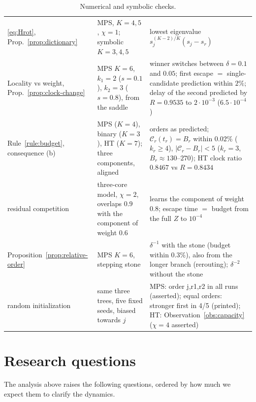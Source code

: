 \documentclass[11pt]{article}
\newcommand{\Clk}{\mathcal{C}}
\theoremstyle{definition}
\numberwithin{equation}{section}
\begin{document}
\begin{table}[tbp]
\begin{tabular}{L{0.21\textwidth}L{0.33\textwidth}L{0.38\textwidth}}
\eqref{eq:Hrot}, Prop.~\ref{prop:dictionary} & MPS, $K=4,5$, $\chi=1$; symbolic $K=3,4,5$ & lowest eigenvalue $s_j^{(K-2)/K}(s_j-s_r)$ \\
Locality vs weight, Prop.~\ref{prop:clock-change} & MPS $K=6$, $k_1=2$ ($s=0.1$), $k_2=3$ ($s=0.8$), from the saddle & winner switches between $\delta=0.1$ and $0.05$; first escape $=$ single-candidate prediction within $2\%$; delay of the second predicted by $R=0.9535$ to $2\cdot10^{-3}$ ($6.5\cdot10^{-4}$) \\
Rule~\ref{rule:budget}, consequence (b) & MPS ($K=4$), binary ($K=3$), HT ($K=7$); three components, aligned & orders as predicted; $\Clk_r(t_r)=B_r$ within $0.02\%$ ($k_r\ge4$), $|\Clk_r-B_r|<5$ ($k_r=3$, $B_r\approx130$--$270$); HT clock ratio $0.8467$ vs $R=0.8434$ \\
residual competition & three-core model, $\chi=2$, overlaps $0.9$ with the component of weight $0.6$ & learns the component of weight $0.8$; escape time $=$ budget from the full $Z$ to $10^{-4}$ \\
Proposition~\ref{prop:relative-order} & MPS $K=6$, stepping stone & $\delta^{-1}$ with the stone (budget within $0.3\%$), also from the longer branch (rerouting); $\delta^{-2}$ without the stone \\
random initialization & same three trees, five fixed seeds, biased towards $j$ & MPS: order j,r1,r2 in all runs (asserted); equal orders: stronger first in 4/5 (printed); HT: Observation~\ref{obs:capacity} ($\chi=4$ asserted) \\
\bottomrule
\end{tabular}
\caption{Numerical and symbolic checks.}
\label{tab:numerics}
\end{table}

\section{Research questions}\label{sec:questions}

The analysis above raises the following questions, ordered by how much we expect them to clarify the dynamics.
\end{document}
